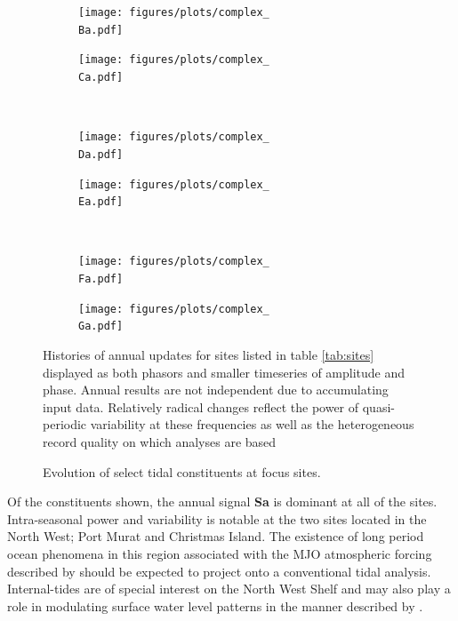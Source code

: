 
\begin{figure}[!hbt] \centering
    \begin{subfigure}[b]{\figwidthHalf}
        \texttt{[image: figures/plots/complex\_\\Ba.pdf]}\caption{\Bname{}}
    \end{subfigure}
    \begin{subfigure}[b]{\figwidthHalf}
        \texttt{[image: figures/plots/complex\_\\Ca.pdf]}\caption{\Cname{}}
    \end{subfigure} 
    \\
    \begin{subfigure}[b]{\figwidthHalf}
        \texttt{[image: figures/plots/complex\_\\Da.pdf]}\caption{\Dname{}}
    \end{subfigure}
    \begin{subfigure}[b]{\figwidthHalf}
        \texttt{[image: figures/plots/complex\_\\Ea.pdf]}\caption{\Ename{}}
    \end{subfigure}
    \\
    \begin{subfigure}[b]{\figwidthHalf}
        \texttt{[image: figures/plots/complex\_\\Fa.pdf]} \caption{\Fname{}}
    \end{subfigure}
    \begin{subfigure}[b]{\figwidthHalf}
        \texttt{[image: figures/plots/complex\_\\Ga.pdf]} \caption{\Gname{}}
    \end{subfigure}
    \caption{Evolution of select tidal constituents at focus sites.}
    {Histories of annual updates for sites listed in table \ref{tab:sites} displayed as both phasors and smaller timeseries of amplitude and phase.  Annual results are not independent due to accumulating input data. Relatively radical changes reflect the power of quasi-periodic variability at these frequencies as well as the heterogeneous record quality on which analyses are based} 
    \label{fig:complexEvolution}
\end{figure}   

Of the constituents shown, the annual signal \textbf{Sa} is dominant at all of the sites.
Intra-seasonal power and variability is notable at the two sites located in the North West; Port Murat and Christmas Island.   The existence of long period ocean phenomena in this region associated with the MJO atmospheric forcing described by \citeauthor{Maxime:2019jc} should be expected to project onto a conventional tidal analysis.   Internal-tides are of special interest on the North West Shelf \citep{10.3389/fmars.2021.629372} and may also play a role in  modulating surface water level patterns in the manner described by \citeauthor{Colosi:2006va}.

